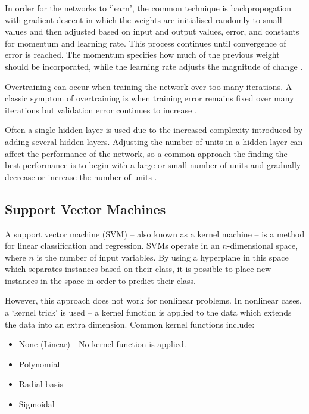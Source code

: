 In order for the networks to `learn', the common technique is backpropogation with gradient
descent in which
the weights are initialised randomly to small values and then adjusted based on input and
output values, error, and constants for momentum and learning rate. This process
continues until convergence of error is reached. The momentum
specifies how much of the previous weight should be incorporated, while the learning
rate adjusts the magnitude of change \cite{intro_to_machine_learning_2010}.

Overtraining can occur when training the network over too many iterations. A classic symptom
of overtraining is when training error remains fixed over many iterations but validation error
continues to increase \cite{intro_to_machine_learning_2010}.

Often a single hidden layer is used due to the increased complexity introduced by adding
several hidden layers. Adjusting the number of units in a hidden layer can affect the performance
of the network, so a common approach the finding the best performance is to begin with a large or
small number of units and gradually decrease or increase the number of units \cite{intro_to_machine_learning_2010}.

\subsection{Support Vector Machines}

A support vector machine (SVM) -- also known as a kernel machine -- is a method for
linear classification and regression. SVMs operate in an $n$-dimensional space, where
$n$ is the number of input variables. By using a hyperplane in this space which separates
instances based on their class, it is possible to place new instances in the space
in order to predict their class.

However, this approach does not work for nonlinear problems. In nonlinear cases, a `kernel trick'
is used -- a kernel function is applied to the data which extends the data into an extra
dimension. Common kernel functions include:

\begin{itemize}
\item None (Linear) - No kernel function is applied.
\item Polynomial
\item Radial-basis
\item Sigmoidal
\end{itemize}


